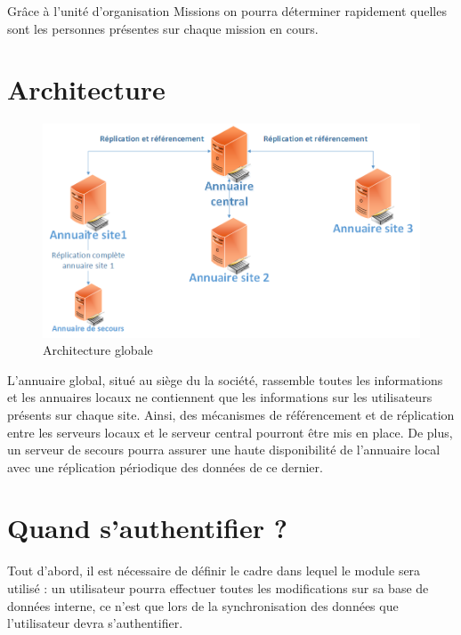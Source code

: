 \documentclass[11pt,fleqn]{report}
\begin{document}
Grâce à l’unité d’organisation Missions on pourra déterminer rapidement quelles sont les personnes présentes sur chaque mission en cours.
\chapter{Architecture}
\begin{figure}[htbp]
	\centering
	\includegraphics[scale=0.6]{Images/SchemaGlobal.png}
	\caption{Architecture globale}
	\label{SchemaGlobal}
\end{figure}
L’annuaire global, situé au siège du la société, rassemble toutes les informations et les annuaires locaux ne contiennent que les informations sur les utilisateurs présents sur chaque site. Ainsi, des mécanismes de référencement et de réplication entre les serveurs locaux et le serveur central pourront être mis en place.
De plus, un serveur de secours pourra assurer une haute disponibilité de l’annuaire local avec une réplication périodique des données de ce dernier.
\chapter{Quand s'authentifier ?}
Tout d’abord, il est nécessaire de définir le cadre dans lequel le module sera utilisé : un utilisateur pourra effectuer toutes les modifications sur sa base de données interne, ce n’est que lors de la synchronisation des données que l’utilisateur devra s’authentifier.
\end{document}
